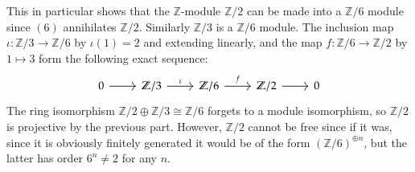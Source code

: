 \documentclass[12pt]{article}
\theoremstyle{definitionstyle}
\def\mbb#1{\mathbb{#1}}
\newcommand{\Z}{\mbb Z}
\begin{document}
\begin{enumerate}
\begin{enumerate}
			This in particular shows that the $\Z$-module $\Z/2$ can be made into a $\Z/6$ module since $(6)$ annihilates $\Z/2$. Similarly $\Z/3$ is a $\Z/6$ module. The inclusion map $\iota: \Z/3 \to \Z/6$ by $\iota(1) = 2$ and extending linearly, and the map $f: \Z/6 \to \Z/2$ by $1 \mapsto 3$ form the following exact sequence:
			\[\begin{tikzcd}
				0 & {\Z/3} & {\Z/6} & {\Z/2} & 0
				\arrow["\iota", from=1-2, to=1-3]
				\arrow["f", from=1-3, to=1-4]
				\arrow[from=1-4, to=1-5]
				\arrow[from=1-1, to=1-2]
			\end{tikzcd}\]
			The ring isomorphism $\Z/2 \oplus \Z/3 \cong \Z/6$ forgets to a module isomorphism, so $\Z/2$ is projective by the previous part. However, $\Z/2$ cannot be free since if it was, since it is obviously finitely generated it would be of the form $(\Z/6)^{\oplus n}$, but the latter has order $6^n \neq 2$ for any $n$.
		\end{enumerate}
	\end{enumerate}
\end{document}
